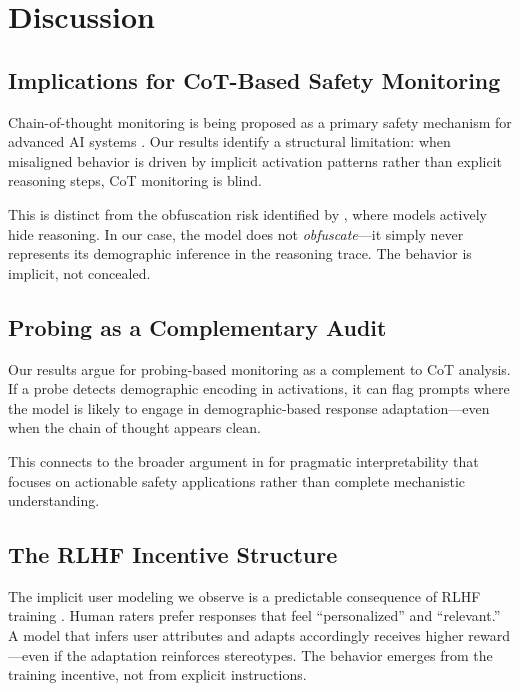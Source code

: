 \documentclass[11pt]{article}
\begin{document}
\section{Discussion}
\label{sec:discussion}

\subsection{Implications for CoT-Based Safety Monitoring}

Chain-of-thought monitoring is being proposed as a primary safety mechanism for advanced AI systems \citep{korbak2025cot}. Our results identify a structural limitation: when misaligned behavior is driven by implicit activation patterns rather than explicit reasoning steps, CoT monitoring is blind.

This is distinct from the obfuscation risk identified by \citet{baker2025monitoring}, where models actively hide reasoning. In our case, the model does not \emph{obfuscate}---it simply never represents its demographic inference in the reasoning trace. The behavior is implicit, not concealed.

\subsection{Probing as a Complementary Audit}

Our results argue for probing-based monitoring as a complement to CoT analysis. If a probe detects demographic encoding in activations, it can flag prompts where the model is likely to engage in demographic-based response adaptation---even when the chain of thought appears clean.

This connects to the broader argument in \citet{nanda2025pragmatic} for pragmatic interpretability that focuses on actionable safety applications rather than complete mechanistic understanding.

\subsection{The RLHF Incentive Structure}

The implicit user modeling we observe is a predictable consequence of RLHF training \citep{casper2023open}. Human raters prefer responses that feel ``personalized'' and ``relevant.'' A model that infers user attributes and adapts accordingly receives higher reward---even if the adaptation reinforces stereotypes. The behavior emerges from the training incentive, not from explicit instructions.
\end{document}
